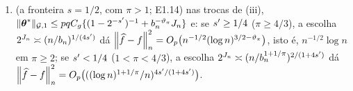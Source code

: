 \documentclass[11pt,a4paper]{article}
\newcommand{\bn}{b_{n}}
\newcommand{\nGone}[1]{\lVert #1\rVert_{\mathcal{G},1}}
\newcommand{\lamG}{\lambda^{\mathcal{G}}_{n}}
\newcommand{\lamGone}{\lambda^{\mathcal{G}}_{n,1}}
\newcommand{\lamGp}{\lambda^{\mathcal{G},+}_{n}}   %
\begin{document}
\begin{corollary}
\begin{enumerate}[label=\textup{(\roman*)}, leftmargin=*]
    $2^{J_{n}} \le 2n$ na Hipótese~\ref{ass:regime-blocos} e $\lamGp$ de
    \eqref{eq:mu-blocos} no lugar de $\lamG$ (no estimador e em
    \eqref{eq:lenta-blocos}), vale \eqref{eq:lenta-blocos} com
    $(\lamGone)^{2} \le (C_{\pen} + 16\Lambda)\sigma^{2}\bn/n$, e:
    \begin{enumerate}[label=\textup{(\alph*)}, leftmargin=*, nosep]
      \item se $s > 1/2$ e $\seff \le 1/4$, a escolha
        $2^{J_{n}} \asymp (n/\log n)^{2/(1+4\seff)}$ dá
        \[
          \normn{\widehat f - f}^{2} =
          O_{p}\bigl((\log n/n)^{4\seff/(1+4\seff)}\bigr),
        \]
        a taxa da Proposição~4(iii)(a) de E1.6;
      \item se $s < 1/2$ e $\seff \le s/2$, a escolha
        $2^{J_{n}} \asymp (n/\bn^{1/\pi})^{1/(1-s+2\seff)}$ dá
        \[
          \normn{\widehat f - f}^{2}
          = O_{p}\Bigl(n^{-2\seff/(1-s+2\seff)}
          (\log n)^{(1/\pi)\,2\seff/(1-s+2\seff)}\Bigr),
        \]
        com $(\log n)^{(1-1/\pi)2\seff/(1-s+2\seff)}$ a menos que a
        Proposição~4(iii)(b) de E1.6;
    \end{enumerate}
  \item \textup{(a fronteira $s = 1/2$, com $\pi > 1$; E1.14)} nas trocas de
    (iii), $\nGone{\thetastar} \le pqC_{g}\{(1-2^{-\seff})^{-1} +
    \bn^{-\vartheta_{\pi}}J_{n}\}$ e: se $s' \ge 1/4$ ($\pi \ge 4/3$), a
    escolha $2^{J_{n}} \asymp (n/\bn)^{1/(4\seff)}$ dá
    $\left\lVert \widehat f - f \right\rVert_{n}^{2} = O_{p}\bigl(n^{-1/2}(\log
    n)^{3/2-\vartheta_{\pi}}\bigr)$, isto é, $n^{-1/2}\log n$ em $\pi \ge 2$; se
    $s' < 1/4$ ($1 < \pi < 4/3$), a escolha $2^{J_{n}} \asymp
    (n/\bn^{1+1/\pi})^{2/(1+4\seff)}$ dá $\left\lVert \widehat f - f \right\rVert_{n}^{2} =
    O_{p}\bigl(((\log n)^{1+1/\pi}/n)^{4s'/(1+4s')}\bigr)$.
\end{enumerate}
\end{corollary}
\end{document}
